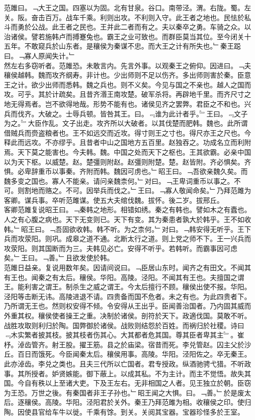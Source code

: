 \documentclass{zhvt-classic}
\begin{document}
\hspace*{2em}范雎曰。﹁大王之国。四塞以为固。北有甘泉。谷口。南带泾。渭。右陇。蜀。左关。阪。奋击百万。战车千乘。利则出攻。不利则入守。此王者之地也。民怯於私斗而勇於公战。此王者之民也。王并此二者而有之。夫以秦卒之勇。车骑之众。以治诸侯。譬若施韩卢而搏蹇兔也。霸王之业可致也。而群臣莫当其位。至今闭关十五年。不敢窥兵於山东者。是穰侯为秦谋不忠。而大王之计有所失也。﹂秦王跽曰。﹁寡人原闻失计。﹂\\
\hspace*{2em}然左右多窃听者。范雎恐。未敢言内。先言外事。以观秦王之俯仰。因进曰。﹁夫穰侯越韩。魏而攻齐纲寿。非计也。少出师则不足以伤齐。多出师则害於秦。臣意王之计。欲少出师而悉韩。魏之兵也。则不义矣。今见与国之不亲也。越人之国而攻。可乎。其於计疏矣。且昔齐湣王南攻楚。破军杀将。再辟地千里。而齐尺寸之地无得焉者。岂不欲得地哉。形势不能有也。诸侯见齐之罢弊。君臣之不和也。兴兵而伐齐。大破之。士辱兵顿。皆咎其王。曰。﹃谁为此计者乎。﹄王曰。﹃文子为之。﹄大臣作乱。文子出走。攻齐所以大破者。以其伐楚而肥韩。魏也。此所谓借贼兵而赍盗粮者也。王不如远交而近攻。得寸则王之寸也。得尺亦王之尺也。今释此而远攻。不亦缪乎。且昔者中山之国地方五百里。赵独吞之。功成名立而利附焉。天下莫之能害也。今夫韩。魏。中国之处而天下之枢也。王其欲霸。必亲中国以为天下枢。以威楚。赵。楚彊则附赵。赵彊则附楚。楚。赵皆附。齐必惧矣。齐惧。必卑辞重币以事秦。齐附而韩。魏因可虏也。﹂昭王曰。﹁吾欲亲魏久矣。而魏多变之国也。寡人不能亲。请问亲魏柰何。﹂对曰。﹁王卑词重币以事之。不可。则割地而赂之。不可。因举兵而伐之。﹂王曰。﹁寡人敬闻命矣。﹂乃拜范雎为客卿。谋兵事。卒听范雎谋。使五大夫绾伐魏。拔怀。後二岁。拔邢丘。\\
\hspace*{2em}客卿范雎复说昭王曰。﹁秦韩之地形。相错如绣。秦之有韩也。譬如木之有蠹也。人之有心腹之病也。天下无变则已。天下有变。其为秦患者孰大於韩乎。王不如收韩。﹂昭王曰。﹁吾固欲收韩。韩不听。为之柰何。﹂对曰。﹁韩安得无听乎。王下兵而攻荥阳。则巩。成皋之道不通。北断太行之道。则上党之师不下。王一兴兵而攻荥阳。则其国断而为三。夫韩见必亡。安得不听乎。若韩听。而霸事因可虑矣。﹂王曰。﹁善。﹂且欲发使於韩。\\
\hspace*{2em}范雎日益亲。复说用数年矣。因请间说曰。﹁臣居山东时。闻齐之有田文。不闻其有王也。闻秦之有太后。穰侯。华阳。高陵。泾阳。不闻其有王也。夫擅国之谓王。能利害之谓王。制杀生之威之谓王。今太后擅行不顾。穰侯出使不报。华阳。泾阳等击断无讳。高陵进退不请。四贵备而国不危者。未之有也。为此四贵者下。乃所谓无王也。然则权安得不倾。令安得从王出乎。臣闻善治国者。乃内固其威而外重其权。穰侯使者操王之重。决制於诸侯。剖符於天下。政適伐国。莫敢不听。战胜攻取则利归於陶。国弊御於诸侯。战败则结怨於百姓。而祸归於社稷。诗曰﹃木实繁者披其枝。披其枝者伤其心。大其都者危其国。尊其臣者卑其主﹄。崔杼。淖齿管齐。射王股。擢王筋。县之於庙梁。宿昔而死。李兑管赵。囚主父於沙丘。百日而饿死。今臣闻秦太后。穰侯用事。高陵。华阳。泾阳佐之。卒无秦王。此亦淖齿。李兑之类也。且夫三代所以亡国者。君专授政。纵酒驰骋弋猎。不听政事。其所授者。妒贤嫉能。御下蔽上。以成其私。不为主计。而主不觉悟。故失其国。今自有秩以上至诸大吏。下及王左右。无非相国之人者。见王独立於朝。臣窃为王恐。万世之後。有秦国者非王子孙也。﹂昭王闻之大惧。曰。﹁善。﹂於是废太后。逐穰侯。高陵。华阳。泾阳君於关外。秦王乃拜范雎为相。收穰侯之印。使归陶。因使县官给车牛以徙。千乘有馀。到关。关阅其宝器。宝器珍怪多於王室。\\
\end{document}
